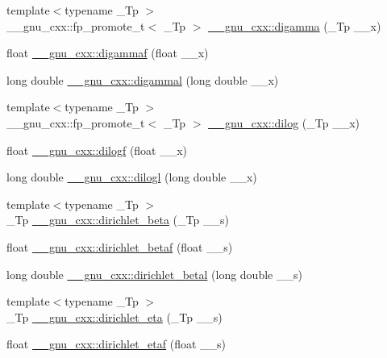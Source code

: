 \begin{DoxyCompactItemize}
\item 
{\footnotesize template$<$typename \+\_\+\+Tp $>$ }\\\+\_\+\+\_\+gnu\+\_\+cxx\+::fp\+\_\+promote\+\_\+t$<$ \+\_\+\+Tp $>$ \hyperlink{group__gnu__math__spec__func_ga7b87300edf8754d959e1d94fe0c9246e}{\+\_\+\+\_\+gnu\+\_\+cxx\+::digamma} (\+\_\+\+Tp \+\_\+\+\_\+x)
\item 
float \hyperlink{group__gnu__math__spec__func_ga65b58ffe1d02ccda1113539b62d87b94}{\+\_\+\+\_\+gnu\+\_\+cxx\+::digammaf} (float \+\_\+\+\_\+x)
\item 
long double \hyperlink{group__gnu__math__spec__func_gaaa1bf1503709175915cb81bcd4355ccf}{\+\_\+\+\_\+gnu\+\_\+cxx\+::digammal} (long double \+\_\+\+\_\+x)
\item 
{\footnotesize template$<$typename \+\_\+\+Tp $>$ }\\\+\_\+\+\_\+gnu\+\_\+cxx\+::fp\+\_\+promote\+\_\+t$<$ \+\_\+\+Tp $>$ \hyperlink{group__gnu__math__spec__func_ga4185ee1a0f9189a18085f65d52b6bc9b}{\+\_\+\+\_\+gnu\+\_\+cxx\+::dilog} (\+\_\+\+Tp \+\_\+\+\_\+x)
\item 
float \hyperlink{group__gnu__math__spec__func_ga901091e0e7ce7d6113ae6a86f4865a92}{\+\_\+\+\_\+gnu\+\_\+cxx\+::dilogf} (float \+\_\+\+\_\+x)
\item 
long double \hyperlink{group__gnu__math__spec__func_gae90c13ee690ebaf10a18a900fe2646f9}{\+\_\+\+\_\+gnu\+\_\+cxx\+::dilogl} (long double \+\_\+\+\_\+x)
\item 
{\footnotesize template$<$typename \+\_\+\+Tp $>$ }\\\+\_\+\+Tp \hyperlink{group__gnu__math__spec__func_ga87466a2d429a2815d794acc21c882b08}{\+\_\+\+\_\+gnu\+\_\+cxx\+::dirichlet\+\_\+beta} (\+\_\+\+Tp \+\_\+\+\_\+s)
\item 
float \hyperlink{group__gnu__math__spec__func_ga9bb40e20b18e3eb822e70af955940830}{\+\_\+\+\_\+gnu\+\_\+cxx\+::dirichlet\+\_\+betaf} (float \+\_\+\+\_\+s)
\item 
long double \hyperlink{group__gnu__math__spec__func_gaed6fd85a4577f4de66d74742a1850a13}{\+\_\+\+\_\+gnu\+\_\+cxx\+::dirichlet\+\_\+betal} (long double \+\_\+\+\_\+s)
\item 
{\footnotesize template$<$typename \+\_\+\+Tp $>$ }\\\+\_\+\+Tp \hyperlink{group__gnu__math__spec__func_gae46e26e4107675d285c79a2d6202e6c7}{\+\_\+\+\_\+gnu\+\_\+cxx\+::dirichlet\+\_\+eta} (\+\_\+\+Tp \+\_\+\+\_\+s)
\item 
float \hyperlink{group__gnu__math__spec__func_ga6f05d076600b1de9193e586cf89547c9}{\+\_\+\+\_\+gnu\+\_\+cxx\+::dirichlet\+\_\+etaf} (float \+\_\+\+\_\+s)

\end{DoxyCompactItemize}
